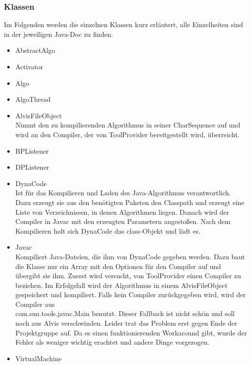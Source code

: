\documentclass[10pt,a4paper,oneside]{scrbook}
\begin{document}
\subsubsection{Klassen}
Im Folgenden werden die einzelnen Klassen kurz erläutert, alle Einzelheiten sind in der jeweiligen Java-Doc zu finden.
\begin{itemize}
 \item AbstractAlgo\\
 \item Activator\\
 \item Algo\\
 \item AlgoThread\\
 \item AlvisFileObject\\
    Nimmt den zu kompilierenden Algorithmus in seiner CharSequence auf und wird an den Compiler, der von ToolProvider
    bereitgestellt wird, überreicht.
 \item BPListener\\
 \item DPListener\\
 \item DynaCode\\
    Ist für das Kompilieren und Laden des Java-Algorithmus verantwortlich.
    Dazu erzeugt sie aus den benötigten Paketen den Classpath und erzeugt eine Liste von Verzeichnissen, in denen
    Algorithmen liegen. Danach wird der Compiler in Javac mit den erzeugten Parametern angestoßen. Nach dem Kompilieren
    holt sich DynaCode das class-Objekt und lädt es.
 \item Javac\\
    Kompiliert Java-Dateien, die ihm von DynaCode gegeben werden. Dazu baut die Klasse nur ein Array mit den
    Optionen für den Compiler auf und übergibt sie ihm. Zuerst wird versucht, von ToolProvider einen Compiler zu
    beziehen. Im Erfolgsfall wird der Algorithmus in einem AlvisFileObject gespeichert und kompiliert.
    Falls kein Compiler zurückgegeben wird, wird der Compiler aus\\com.sun.tools.javac.Main benutzt.
    Dieser Fallback ist nicht schön und soll noch aus Alvis verschwinden. Leider trat das Problem erst gegen Ende der
    Projektgruppe auf. Da es einen funktionierenden Workaround gibt, wurde der Fehler als weniger wichtig erachtet und
    andere Dinge vorgezogen.
 \item VirtualMachine \\
\end{itemize}
\end{document}
